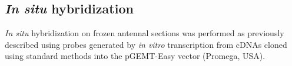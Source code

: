 \subsection*{\emph{In situ} hybridization}

\emph{In situ} hybridization on frozen antennal sections was performed as previously described \cite{ein_Morozov_Rzhetsky_Axel_1999} using probes generated by \emph{in vitro} transcription from cDNAs cloned using standard methods into the pGEMT-Easy vector (Promega, USA).